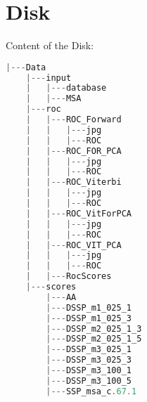 \chapter{Disk }
\label{app:AppDisk}


Content of the Disk:


\begin{lstlisting}[language=C,numbers=none,
caption=Contents of the Disc,
label=fubarTest]
|---Data
    |---input
    |   |---database
    |   |---MSA
    |---roc
    |   |---ROC_Forward
    |   |   |---jpg
    |   |   |---ROC
    |   |---ROC_FOR_PCA
    |   |   |---jpg
    |   |   |---ROC
    |   |---ROC_Viterbi
    |   |   |---jpg
    |   |   |---ROC
    |   |---ROC_VitForPCA
    |   |   |---jpg
    |   |   |---ROC
    |   |---ROC_VIT_PCA
    |   |   |---jpg
    |   |   |---ROC
    |   |---RocScores
    |---scores
        |---AA
        |---DSSP_m1_025_1
        |---DSSP_m1_025_3
        |---DSSP_m2_025_1_3
        |---DSSP_m2_025_1_5
        |---DSSP_m3_025_1
        |---DSSP_m3_025_3
        |---DSSP_m3_100_1
        |---DSSP_m3_100_5
        |---SSP_msa_c.67.1
\end{lstlisting}
